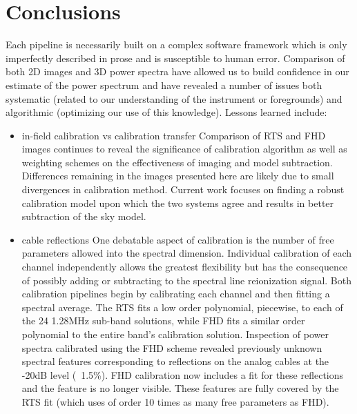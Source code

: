 \documentclass[preprint]{aastex}
\begin{document}
\section{Conclusions}
\label{sec:conclusion}
      Each pipeline is necessarily built on a complex software framework which is only imperfectly described in prose and is susceptible to human error.  Comparison of both 2D images and 3D power spectra have allowed us to build confidence in our estimate of the power spectrum and have revealed a number of issues both systematic (related to our understanding of the instrument or foregrounds) and algorithmic (optimizing our use of this knowledge). Lessons learned include:
\begin{itemize}
\item in-field calibration vs calibration transfer
Comparison of RTS and FHD images continues to reveal the significance of calibration algorithm as well as weighting schemes on the effectiveness of imaging and model subtraction.  Differences remaining in the images presented here are likely due to small divergences in calibration method. Current work focuses on finding a robust calibration model upon which the two systems agree and results in better subtraction of the sky model.

\item cable reflections
One debatable aspect of calibration is the number of free parameters allowed into the spectral dimension. Individual calibration of each channel independently allows the greatest flexibility but has the consequence of possibly adding or subtracting to the spectral line reionization signal.  Both calibration pipelines begin by calibrating each channel and then fitting a spectral average.  The RTS fits a low order polynomial, piecewise, to each of the 24 1.28MHz sub-band solutions, while FHD fits a similar order polynomial to the entire  band's calibration solution.  Inspection of power spectra calibrated using the FHD scheme revealed  previously unknown spectral features corresponding to reflections on the analog cables at the -20dB level (~1.5\%). FHD calibration now includes a fit for these reflections and the feature is no longer visible. These features are fully covered by the RTS fit (which uses of order 10 times as many free parameters as FHD).


\end{itemize}
\end{document}
